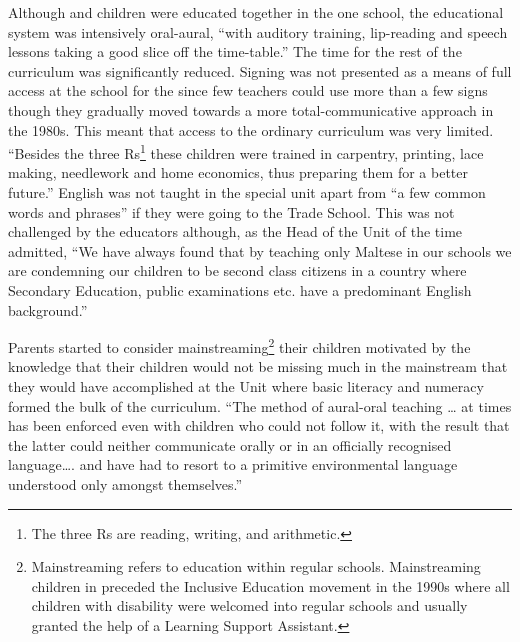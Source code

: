 \documentclass[output=paper]{langsci/langscibook}
\begin{document}
Although  and  children were educated together in the one
school, the educational system was intensively oral-aural, “with
auditory training, lip-reading and speech lessons taking a good slice
off the time-table.” \citep[36]{g91} The time for
the rest of the curriculum was significantly reduced. Signing was not
presented as a means of full access at the school for the  since
few teachers could use more than a few signs though they gradually
moved towards a more total-communicative approach in the 1980s.  This
meant that access to the ordinary curriculum was very limited.
“Besides the three Rs\footnote{The three Rs are reading, writing, and arithmetic.} these children were trained in carpentry,
printing, lace making, needlework and home economics, thus preparing
them for a better future.” \citep[38]{g91}
English was not taught in the special unit apart from “a few common
words and phrases” if they were going to the Trade School.  This was
not challenged by the educators although, as the Head of the  Unit
of the time admitted, “We have always found that by teaching only
Maltese in our schools we are condemning our  children to be
second class citizens in a country where Secondary Education, public
examinations etc. have a predominant English background.” 
\citep[39]{g91}

Parents started to consider mainstreaming\footnote{Mainstreaming
  refers to education within regular schools.  Mainstreaming 
  children in  preceded the Inclusive Education movement in the
  1990s where all children with disability were welcomed into regular
  schools and usually granted the help of a Learning Support
  Assistant.} their  children motivated by the knowledge that
their children would not be missing much in the mainstream that they
would have accomplished at the  Unit where basic literacy and
numeracy formed the bulk of the curriculum.  “The method of aural-oral
teaching {\dots} at times has been enforced even with children who could
not follow it, with the result that the latter could neither
communicate orally or in an officially recognised 
language{\dots}. and have had to resort to a primitive environmental 
language understood only amongst themselves.” 
\citep[50-51]{ba91}
\end{document}
